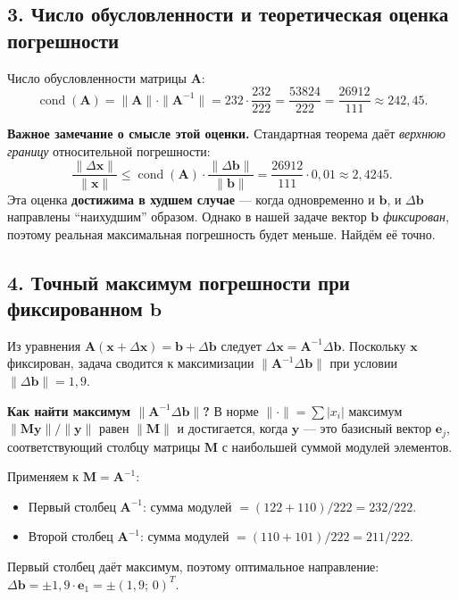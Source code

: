 \documentclass{article}
\begin{document}
\subsection*{3. Число обусловленности и теоретическая оценка погрешности}

Число обусловленности матрицы $\mathbf{A}$:
\begin{equation}
\operatorname{cond}(\mathbf{A}) = \|\mathbf{A}\| \cdot \|\mathbf{A}^{-1}\| = 232 \cdot \frac{232}{222} = \frac{53824}{222} = \frac{26912}{111} \approx 242{,}45.
\end{equation}

\textbf{Важное замечание о смысле этой оценки.} Стандартная теорема даёт \textit{верхнюю границу} относительной погрешности:
\begin{equation}
\frac{\|\Delta\mathbf{x}\|}{\|\mathbf{x}\|} \leqslant \operatorname{cond}(\mathbf{A}) \cdot \frac{\|\Delta\mathbf{b}\|}{\|\mathbf{b}\|} = \frac{26912}{111} \cdot 0{,}01 \approx 2{,}4245.
\end{equation}
Эта оценка \textbf{достижима в худшем случае} --- когда одновременно и $\mathbf{b}$, и $\Delta\mathbf{b}$ направлены ``наихудшим'' образом. Однако в нашей задаче вектор $\mathbf{b}$ \textit{фиксирован}, поэтому реальная максимальная погрешность будет меньше. Найдём её точно.

\subsection*{4. Точный максимум погрешности при фиксированном $\mathbf{b}$}

Из уравнения $\mathbf{A}(\mathbf{x} + \Delta\mathbf{x}) = \mathbf{b} + \Delta\mathbf{b}$ следует $\Delta\mathbf{x} = \mathbf{A}^{-1}\Delta\mathbf{b}$. Поскольку $\mathbf{x}$ фиксирован, задача сводится к максимизации $\|\mathbf{A}^{-1}\Delta\mathbf{b}\|$ при условии $\|\Delta\mathbf{b}\| = 1{,}9$.

\textbf{Как найти максимум $\|\mathbf{A}^{-1}\Delta\mathbf{b}\|$?} В норме $\|\cdot\| = \sum |x_i|$ максимум $\|\mathbf{M}\mathbf{y}\|/\|\mathbf{y}\|$ равен $\|\mathbf{M}\|$ и достигается, когда $\mathbf{y}$ --- это базисный вектор $\mathbf{e}_j$, соответствующий столбцу матрицы $\mathbf{M}$ с наибольшей суммой модулей элементов.

Применяем к $\mathbf{M} = \mathbf{A}^{-1}$:
\begin{itemize}
    \item Первый столбец $\mathbf{A}^{-1}$: сумма модулей $= (122 + 110)/222 = 232/222$.
    \item Второй столбец $\mathbf{A}^{-1}$: сумма модулей $= (110 + 101)/222 = 211/222$.
\end{itemize}
Первый столбец даёт максимум, поэтому оптимальное направление: $\Delta\mathbf{b} = \pm 1{,}9 \cdot \mathbf{e}_1 = \pm(1{,}9;\, 0)^T$.
\end{document}
